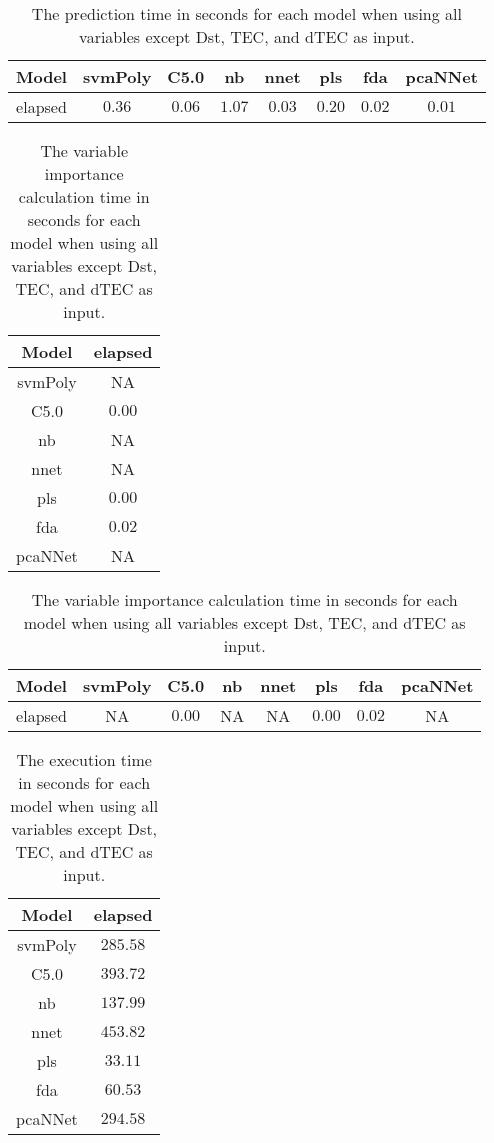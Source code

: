 \begin{table}[!ht]
	\centering
	\begin{tabular}{|c|c|c|c|c|c|c|c|}
		\hline
		Model & svmPoly & C5.0 & nb & nnet & pls & fda & pcaNNet \\ \hline
		elapsed & $0.36$ & $0.06$ & $1.07$ & $0.03$ & $0.20$ & $0.02$ & $0.01$ \\ \hline
	\end{tabular}
	\caption{The prediction time in seconds for each model when using all variables except Dst, TEC, and dTEC as input.}
	\label{tab:time:reverse:noTEC:predict}
\end{table}

\begin{table}[!ht]
	\centering
	\begin{tabular}{|c|c|}
		\hline
		Model & elapsed \\ \hline
		svmPoly & NA \\ \hline
		C5.0 & $0.00$ \\ \hline
		nb & NA \\ \hline
		nnet & NA \\ \hline
		pls & $0.00$ \\ \hline
		fda & $0.02$ \\ \hline
		pcaNNet & NA \\ \hline
	\end{tabular}
	\caption{The variable importance calculation time in seconds for each model when using all variables except Dst, TEC, and dTEC as input.}
	\label{tab:time:noTEC:importance}
\end{table}

\begin{table}[!ht]
	\centering
	\begin{tabular}{|c|c|c|c|c|c|c|c|}
		\hline
		Model & svmPoly & C5.0 & nb & nnet & pls & fda & pcaNNet \\ \hline
		elapsed & NA & $0.00$ & NA & NA & $0.00$ & $0.02$ & NA \\ \hline
	\end{tabular}
	\caption{The variable importance calculation time in seconds for each model when using all variables except Dst, TEC, and dTEC as input.}
	\label{tab:time:reverse:noTEC:importance}
\end{table}

\begin{table}[!ht]
	\centering
	\begin{tabular}{|c|c|}
		\hline
		Model & elapsed \\ \hline
		svmPoly & $285.58$ \\ \hline
		C5.0 & $393.72$ \\ \hline
		nb & $137.99$ \\ \hline
		nnet & $453.82$ \\ \hline
		pls & $33.11$ \\ \hline
		fda & $60.53$ \\ \hline
		pcaNNet & $294.58$ \\ \hline
	\end{tabular}
	\caption{The execution time in seconds for each model when using all variables except Dst, TEC, and dTEC as input.}
	\label{tab:time:noTEC:total}
\end{table}


